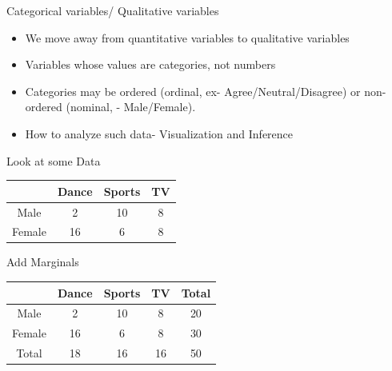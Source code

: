 \documentclass{beamer}\usepackage[]{graphicx}\usepackage[]{color}
\begin{document}
\begin{frame}[fragile]{Categorical variables/ Qualitative variables}

\begin{itemize}
\item We move away from quantitative variables to qualitative variables

\item Variables whose values are categories, not numbers

\item Categories may be ordered (ordinal, ex- Agree/Neutral/Disagree) or non-ordered (nominal, - Male/Female).

\item How to analyze such data- Visualization and Inference

\end{itemize}

\end{frame}

\begin{frame}[fragile]{Look at some Data}

\begin{tabular}{|c|c|c|c|}
\hline
& Dance & Sports & TV  \\ \hline
Male  & 2 & 10 & 8  \\ \hline
Female & 16  & 6 & 8 \\ \hline
\end{tabular}

\end{frame}

\begin{frame}[fragile]{ Add Marginals}

\begin{tabular}{|c|c|c|c|c|}
\hline
& Dance & Sports & TV  & Total \\ \hline
Male  & 2 & 10 & 8 & 20 \\ \hline
Female & 16  & 6 & 8 & 30 \\ \hline
Total & 18 & 16 & 16 & 50 \\ \hline
\end{tabular}

\end{frame}
\end{document}
